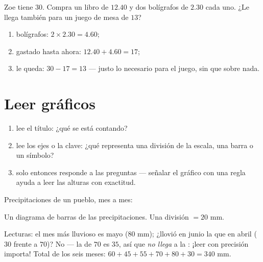 \begin{example}\label{ex:g5:data:budget}
Zoe tiene $30$. Compra un libro de $12.40$ y dos bolígrafos de $2.30$
cada uno. ¿Le llega también para un juego de mesa de $13$?
\begin{enumerate}
  \item bolígrafos: $2 \times 2.30 = 4.60$;
  \item gastado hasta ahora: $12.40 + 4.60 = 17$;
  \item le queda: $30 - 17 = 13$ --- justo lo necesario para el juego,
        sin que sobre nada.
\end{enumerate}
\end{example}

\section{Leer gráficos}

\begin{method}\label{met:g5:data:read}
\begin{enumerate}
  \item lee el título: ¿qué se está contando?
  \item lee los ejes o la clave: ¿qué representa una división de la escala, una barra
        o un símbolo?
  \item solo entonces responde a las preguntas --- señalar el gráfico con una
        regla ayuda a leer las alturas con exactitud.
\end{enumerate}
\end{method}

\begin{example}\label{ex:g5:data:chart}
Precipitaciones de un pueblo, mes a mes:

\begin{omfigure}

{\small Un diagrama de barras de las precipitaciones. Una división $= 20$ mm.}
\end{omfigure}

Lecturas: el mes más lluvioso es mayo ($80$ mm); ¿llovió en junio la  que
en abril ($30$ frente a $70$)? No --- la  de $70$ es $35$, así que
\emph{no llega} a la : ¡leer con precisión importa! Total de los
seis meses: $60 + 45 + 55 + 70 + 80 + 30 = 340$ mm.
\end{example}

